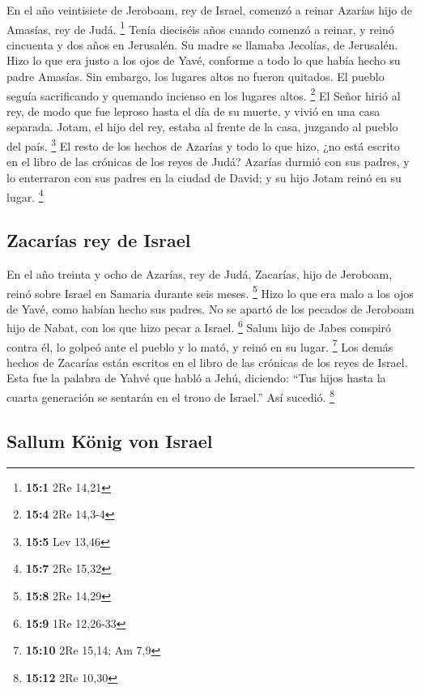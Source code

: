 \begin{paracol}{2}
 En el año veintisiete de Jeroboam, rey de Israel, comenzó
a reinar Azarías hijo de Amasías, rey de Judá. \footnote{\textbf{15:1}
  2Re 14,21}  Tenía dieciséis años cuando comenzó a
reinar, y reinó cincuenta y dos años en Jerusalén. Su madre se llamaba
Jecolías, de Jerusalén.  Hizo lo que era justo a los ojos
de Yavé, conforme a todo lo que había hecho su padre Amasías.
 Sin embargo, los lugares altos no fueron quitados. El
pueblo seguía sacrificando y quemando incienso en los lugares altos.
\footnote{\textbf{15:4} 2Re 14,3-4}  El Señor hirió al
rey, de modo que fue leproso hasta el día de su muerte, y vivió en una
casa separada. Jotam, el hijo del rey, estaba al frente de la casa,
juzgando al pueblo del país. \footnote{\textbf{15:5} Lev 13,46}
 El resto de los hechos de Azarías y todo lo que hizo, ¿no
está escrito en el libro de las crónicas de los reyes de Judá?
 Azarías durmió con sus padres, y lo enterraron con sus
padres en la ciudad de David; y su hijo Jotam reinó en su lugar.
\footnote{\textbf{15:7} 2Re 15,32}

\hypertarget{zacaruxedas-rey-de-israel}{%
\subsection{Zacarías rey de Israel}\label{zacaruxedas-rey-de-israel}}

 En el año treinta y ocho de Azarías, rey de Judá,
Zacarías, hijo de Jeroboam, reinó sobre Israel en Samaria durante seis
meses. \footnote{\textbf{15:8} 2Re 14,29}  Hizo lo que era
malo a los ojos de Yavé, como habían hecho sus padres. No se apartó de
los pecados de Jeroboam hijo de Nabat, con los que hizo pecar a Israel.
\footnote{\textbf{15:9} 1Re 12,26-33}  Salum hijo de
Jabes conspiró contra él, lo golpeó ante el pueblo y lo mató, y reinó en
su lugar. \footnote{\textbf{15:10} 2Re 15,14; Am 7,9} 
Los demás hechos de Zacarías están escritos en el libro de las crónicas
de los reyes de Israel.  Esta fue la palabra de Yahvé que
habló a Jehú, diciendo: ``Tus hijos hasta la cuarta generación se
sentarán en el trono de Israel.'' Así sucedió. \footnote{\textbf{15:12}
  2Re 10,30}

\hypertarget{sallum-kuxf6nig-von-israel}{%
\subsection{Sallum König von Israel}\label{sallum-kuxf6nig-von-israel}}


\end{paracol}
